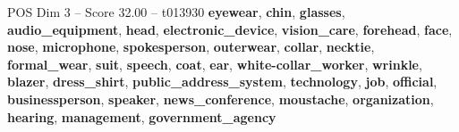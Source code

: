 \begin{textsample}{POS Dim 3 – Score 32.00 – t013930}  \label{ex:f3_pos_008}
\textbf{eyewear}, \textbf{chin}, \textbf{glasses}, \textbf{audio\_equipment}, \textbf{head}, \textbf{electronic\_device}, \textbf{vision\_care}, \textbf{forehead}, \textbf{face}, \textbf{nose}, \textbf{microphone}, \textbf{spokesperson}, \textbf{outerwear}, \textbf{collar}, \textbf{necktie}, \textbf{formal\_wear}, \textbf{suit}, \textbf{speech}, \textbf{coat}, \textbf{ear}, \textbf{white-collar\_worker}, \textbf{wrinkle}, \textbf{blazer}, \textbf{dress\_shirt}, \textbf{public\_address\_system}, \textbf{technology}, \textbf{job}, \textbf{official}, \textbf{businessperson}, \textbf{speaker}, \textbf{news\_conference}, \textbf{moustache}, \textbf{organization}, \textbf{hearing}, \textbf{management}, \textbf{government\_agency}

\end{textsample}
